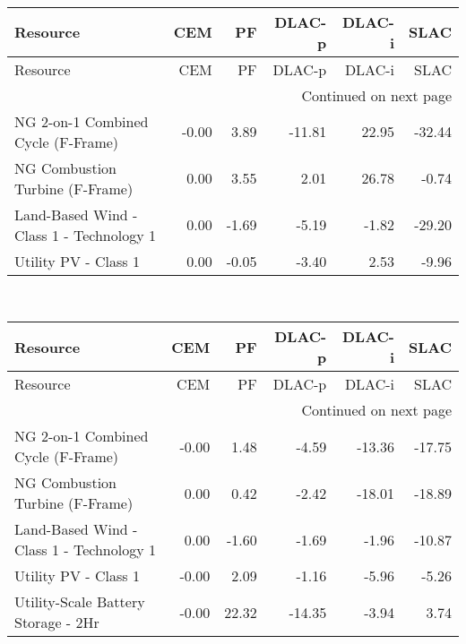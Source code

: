 \documentclass{article}
\begin{document}
\hline
{} \\
\hline
\begin{longtable}{lrrrrr}
\toprule
Resource & CEM & PF & DLAC-p & DLAC-i & SLAC \\
\midrule
\endfirsthead
\toprule
Resource & CEM & PF & DLAC-p & DLAC-i & SLAC \\
\midrule
\endhead
\midrule
\multicolumn{6}{r}{Continued on next page} \\
\midrule
\endfoot
\bottomrule
\endlastfoot
NG 2-on-1 Combined Cycle (F-Frame) & -0.00 & 3.89 & -11.81 & 22.95 & -32.44 \\
NG Combustion Turbine (F-Frame) & 0.00 & 3.55 & 2.01 & 26.78 & -0.74 \\
Land-Based Wind - Class 1 - Technology 1 & 0.00 & -1.69 & -5.19 & -1.82 & -29.20 \\
Utility PV - Class 1 & 0.00 & -0.05 & -3.40 & 2.53 & -9.96 \\
\end{longtable}


\hline
{} \\
\hline
\begin{longtable}{lrrrrr}
\toprule
Resource & CEM & PF & DLAC-p & DLAC-i & SLAC \\
\midrule
\endfirsthead
\toprule
Resource & CEM & PF & DLAC-p & DLAC-i & SLAC \\
\midrule
\endhead
\midrule
\multicolumn{6}{r}{Continued on next page} \\
\midrule
\endfoot
\bottomrule
\endlastfoot
NG 2-on-1 Combined Cycle (F-Frame) & -0.00 & 1.48 & -4.59 & -13.36 & -17.75 \\
NG Combustion Turbine (F-Frame) & 0.00 & 0.42 & -2.42 & -18.01 & -18.89 \\
Land-Based Wind - Class 1 - Technology 1 & 0.00 & -1.60 & -1.69 & -1.96 & -10.87 \\
Utility PV - Class 1 & -0.00 & 2.09 & -1.16 & -5.96 & -5.26 \\
Utility-Scale Battery Storage - 2Hr & -0.00 & 22.32 & -14.35 & -3.94 & 3.74 \\
\end{longtable}
\end{document}
